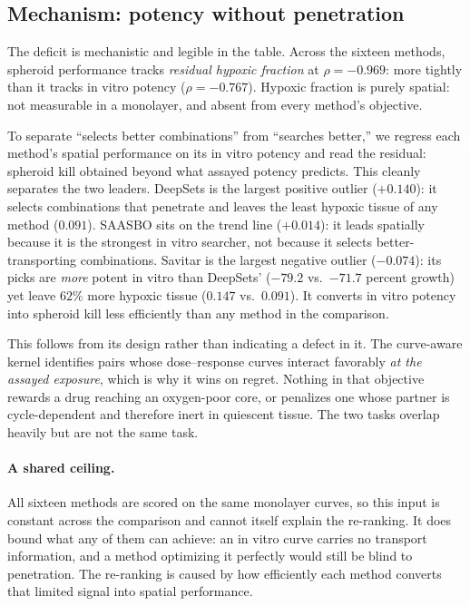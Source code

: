 \documentclass{article}
\begin{document}
\subsection{Mechanism: potency without penetration}
\label{sec:mechanism}

The deficit is mechanistic and legible in the table. Across the sixteen
methods, spheroid performance tracks \emph{residual hypoxic fraction} at
$\rho = -0.969$: more tightly than it tracks in vitro potency
($\rho = -0.767$). Hypoxic fraction is purely spatial: not measurable in a
monolayer, and absent from every method's objective.

To separate ``selects better combinations'' from ``searches better,'' we
regress each method's spatial performance on its in vitro potency and read
the residual: spheroid kill obtained beyond what assayed potency predicts.
This cleanly separates the two leaders. DeepSets is the largest
positive outlier ($+0.140$): it selects combinations that penetrate and
leaves the least hypoxic tissue of any method ($0.091$). SAASBO sits
on the trend line ($+0.014$): it leads spatially because it is the strongest
in vitro searcher, not because it selects better-transporting combinations.
Savitar is the largest negative outlier ($-0.074$): its picks are
\emph{more} potent in vitro than DeepSets' ($-79.2$ vs.\ $-71.7$ percent
growth) yet leave $62\%$ more hypoxic tissue ($0.147$ vs.\ $0.091$).
It converts in vitro potency into spheroid kill less efficiently than any
method in the comparison.

This follows from its design rather than indicating a defect in it. The
curve-aware kernel identifies pairs whose dose--response curves interact
favorably \emph{at the assayed exposure}, which is why it wins on regret.
Nothing in that objective rewards a drug reaching an oxygen-poor core, or
penalizes one whose partner is cycle-dependent and therefore inert in
quiescent tissue. The two tasks overlap heavily but are not the same task.

\paragraph{A shared ceiling.} All sixteen methods are scored on the same
monolayer curves, so this input is constant across the comparison and cannot
itself explain the re-ranking. It does bound what any of them can achieve: an
in vitro curve carries no transport information, and a method optimizing it
perfectly would still be blind to penetration. The re-ranking is caused by
how efficiently each method converts that limited signal into spatial
performance.
\end{document}

